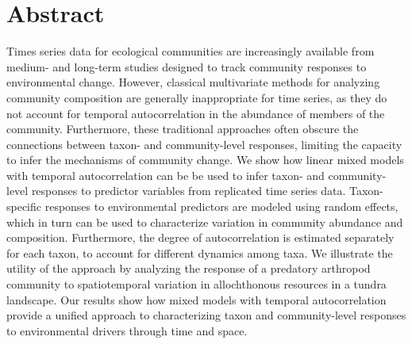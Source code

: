 
\section*{Abstract}

Times series data for ecological communities are increasingly available
from medium- and long-term studies designed to track community responses
to environmental change. However, classical multivariate methods for
analyzing community composition are generally inappropriate for time series,
as they do not account for temporal autocorrelation
in the abundance of members of the community.
Furthermore, these traditional approaches often obscure the connections between
taxon- and community-level responses, limiting the capacity to
infer the mechanisms of community change.
We show how linear mixed models with temporal autocorrelation
can be be used to infer taxon- and community-level responses
to predictor variables from replicated time series data.
Taxon-specific responses to environmental predictors are modeled
using random effects, which in turn can be used to characterize
variation in community abundance and composition.
Furthermore, the degree of autocorrelation is
estimated separately for each taxon,
to account for different dynamics among taxa.
We illustrate the utility of the approach
by analyzing the response of a predatory arthropod community to
spatiotemporal variation in allochthonous resources in a tundra landscape.
Our results show how mixed models with temporal autocorrelation provide
a unified approach to characterizing taxon and community-level
responses to environmental drivers through time and space.

